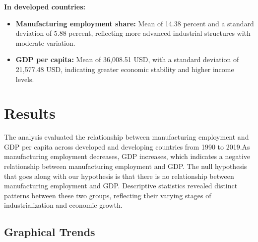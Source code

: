 \documentclass[12pt]{article}
\begin{document}
\textbf{In developed countries:}
\begin{itemize}
\item \textbf{Manufacturing employment share:} Mean of 14.38 percent and a standard deviation of 5.88 percent, reflecting more advanced industrial structures with moderate variation.
\item \textbf{GDP per capita:} Mean of 36,008.51 USD, with a standard deviation of 21,577.48 USD, indicating greater economic stability and higher income levels.
\end{itemize}



\section{Results}
\label{sec:result}

The analysis evaluated the relationship between manufacturing employment and GDP per capita across developed and developing countries from 1990 to 2019.As manufacturing employment decreases, GDP increases, which indicates a negative relationship between manufacturing employment and GDP. The null hypothesis that goes along with our hypothesis is that there is no relationship between manufacturing employment and GDP. Descriptive statistics revealed distinct patterns between these two groups, reflecting their varying stages of industrialization and economic growth.

\subsection{Graphical Trends}
\end{document}
